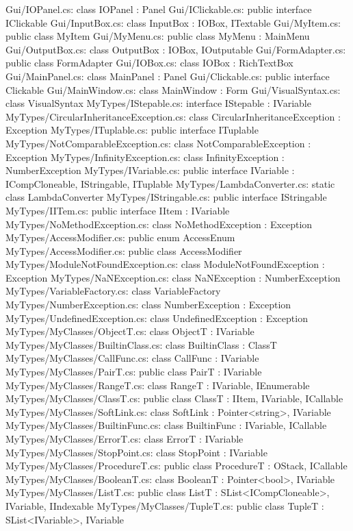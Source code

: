 Gui/IOPanel.cs:	class IOPanel : Panel 
Gui/IClickable.cs:	public interface IClickable 
Gui/InputBox.cs:	class InputBox : IOBox, ITextable 
Gui/MyItem.cs:	public class MyItem 
Gui/MyMenu.cs:	public class MyMenu : MainMenu 
Gui/OutputBox.cs:	class OutputBox : IOBox, IOutputable 
Gui/FormAdapter.cs:	public class FormAdapter 
Gui/IOBox.cs:	class IOBox : RichTextBox 
Gui/MainPanel.cs:	class MainPanel : Panel 
Gui/Clickable.cs:	public interface Clickable 
Gui/MainWindow.cs:	class MainWindow : Form 
Gui/VisualSyntax.cs:	class VisualSyntax 
MyTypes/IStepable.cs:	interface IStepable : IVariable 
MyTypes/CircularInheritanceException.cs:	class CircularInheritanceException : Exception 
MyTypes/ITuplable.cs:	public interface ITuplable 
MyTypes/NotComparableException.cs:	class NotComparableException : Exception 
MyTypes/InfinityException.cs:	class InfinityException : NumberException 
MyTypes/IVariable.cs:	public interface IVariable : ICompCloneable, IStringable, ITuplable 
MyTypes/LambdaConverter.cs:	static class LambdaConverter 
MyTypes/IStringable.cs:	public interface IStringable 
MyTypes/IITem.cs:	public interface IItem : IVariable 
MyTypes/NoMethodException.cs:	class NoMethodException : Exception 
MyTypes/AccessModifier.cs:	public enum AccessEnum 
MyTypes/AccessModifier.cs:	public class AccessModifier 
MyTypes/ModuleNotFoundException.cs:	class ModuleNotFoundException : Exception 
MyTypes/NaNException.cs:	class NaNException : NumberException 
MyTypes/VariableFactory.cs:	class VariableFactory 
MyTypes/NumberException.cs:	class NumberException : Exception 
MyTypes/UndefinedException.cs:	class UndefinedException : Exception 
MyTypes/MyClasses/ObjectT.cs:	class ObjectT : IVariable 
MyTypes/MyClasses/BuiltinClass.cs:	class BuiltinClass : ClassT 
MyTypes/MyClasses/CallFunc.cs:	class CallFunc : IVariable 
MyTypes/MyClasses/PairT.cs:	public class PairT : IVariable 
MyTypes/MyClasses/RangeT.cs:	class RangeT : IVariable, IEnumerable 
MyTypes/MyClasses/ClassT.cs:	public class ClassT : IItem, IVariable, ICallable 
MyTypes/MyClasses/SoftLink.cs:	class SoftLink : Pointer<string>, IVariable 
MyTypes/MyClasses/BuiltinFunc.cs:	class BuiltinFunc : IVariable, ICallable  
MyTypes/MyClasses/ErrorT.cs:	class ErrorT : IVariable 
MyTypes/MyClasses/StopPoint.cs:	class StopPoint : IVariable 
MyTypes/MyClasses/ProcedureT.cs:	public class ProcedureT : OStack, ICallable  
MyTypes/MyClasses/BooleanT.cs:	class BooleanT : Pointer<bool>, IVariable 
MyTypes/MyClasses/ListT.cs:	public class ListT : SList<ICompCloneable>, IVariable, IIndexable 
MyTypes/MyClasses/TupleT.cs:	public class TupleT : SList<IVariable>, IVariable 
